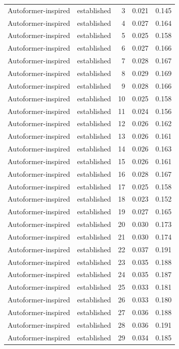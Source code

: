 \begin{tabular}{llrrr}
Autoformer-inspired & established & 3 & 0.021 & 0.145 \\
Autoformer-inspired & established & 4 & 0.027 & 0.164 \\
Autoformer-inspired & established & 5 & 0.025 & 0.158 \\
Autoformer-inspired & established & 6 & 0.027 & 0.166 \\
Autoformer-inspired & established & 7 & 0.028 & 0.167 \\
Autoformer-inspired & established & 8 & 0.029 & 0.169 \\
Autoformer-inspired & established & 9 & 0.028 & 0.166 \\
Autoformer-inspired & established & 10 & 0.025 & 0.158 \\
Autoformer-inspired & established & 11 & 0.024 & 0.156 \\
Autoformer-inspired & established & 12 & 0.026 & 0.162 \\
Autoformer-inspired & established & 13 & 0.026 & 0.161 \\
Autoformer-inspired & established & 14 & 0.026 & 0.163 \\
Autoformer-inspired & established & 15 & 0.026 & 0.161 \\
Autoformer-inspired & established & 16 & 0.028 & 0.167 \\
Autoformer-inspired & established & 17 & 0.025 & 0.158 \\
Autoformer-inspired & established & 18 & 0.023 & 0.152 \\
Autoformer-inspired & established & 19 & 0.027 & 0.165 \\
Autoformer-inspired & established & 20 & 0.030 & 0.173 \\
Autoformer-inspired & established & 21 & 0.030 & 0.174 \\
Autoformer-inspired & established & 22 & 0.037 & 0.191 \\
Autoformer-inspired & established & 23 & 0.035 & 0.188 \\
Autoformer-inspired & established & 24 & 0.035 & 0.187 \\
Autoformer-inspired & established & 25 & 0.033 & 0.181 \\
Autoformer-inspired & established & 26 & 0.033 & 0.180 \\
Autoformer-inspired & established & 27 & 0.036 & 0.188 \\
Autoformer-inspired & established & 28 & 0.036 & 0.191 \\
Autoformer-inspired & established & 29 & 0.034 & 0.185 \\

\end{tabular}
